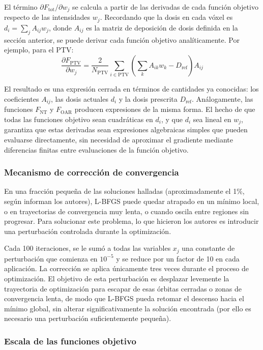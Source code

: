 El término \(\partial F_{\text{tot}}/\partial w_j\) se calcula a partir de las derivadas de cada función objetivo respecto de las intensidades \(w_j\). Recordando que la dosis en cada vóxel es \(d_i = \sum_j A_{ij} w_j\), donde \(A_{ij}\) es la matriz de deposición de dosis definida en la sección anterior, se puede derivar cada función objetivo analíticamente. Por ejemplo, para el PTV:
\[
\frac{\partial F_{\text{PTV}}}{\partial w_j}
=
\frac{2}{N_{\text{PTV}}}
\sum_{i \in \text{PTV}}
\left(\sum_{k} A_{ik} w_k - D_{\text{ref}}\right) A_{ij}
\]
 
El resultado es una expresión cerrada en términos de cantidades ya conocidas: los coeficientes \(A_{ij}\), las dosis actuales \(d_i\) y la dosis prescrita \(D_{\text{ref}}\). Análogamente, las funciones \(F_{\text{NT}}\) y \(F_{\text{OAR}}\) producen expresiones de la misma forma. El hecho de que todas las funciones objetivo sean cuadráticas en \(d_i\), y que \(d_i\) sea lineal en \(w_j\), garantiza que estas derivadas sean expresiones algebraicas simples que pueden evaluarse directamente, sin necesidad de aproximar el gradiente mediante diferencias finitas entre evaluaciones de la función objetivo.

\subsubsection*{Mecanismo de corrección de convergencia}

En una fracción pequeña de las soluciones halladas (aproximadamente el 1\%, según informan los autores), L-BFGS puede quedar atrapado en un mínimo local, o en trayectorias de convergencia muy lenta, o cuando oscila entre regiones sin progresar. Para solucionar este problema, lo que hicieron los autores es introducir una perturbación controlada durante la optimización.

Cada 100 iteraciones, se le sumó a todas las variables \(x_j\) una constante de perturbación que comienza en \(10^{-5}\) y se reduce por un factor de 10 en cada aplicación. La corrección se aplica únicamente tres veces durante el proceso de optimización. El objetivo de esta perturbación es desplazar levemente la trayectoria de optimización para escapar de esas órbitas cerradas o zonas de convergencia lenta, de modo que L-BFGS pueda retomar el descenso hacia el mínimo global, sin alterar significativamente la solución encontrada (por ello es necesario una perturbación suficientemente pequeña).

\subsubsection*{Escala de las funciones objetivo}

